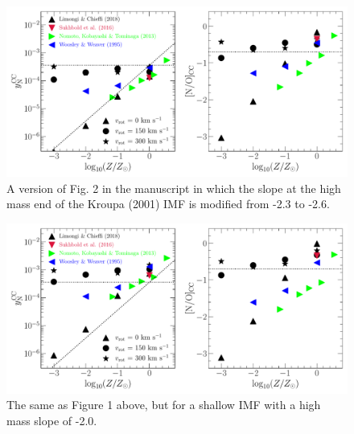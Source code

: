 \documentclass[12pt]{article}
\begin{document}
\newpage
\begin{figure}[!h]
\centering
\includegraphics[scale = 0.6]{n_cc_yields_steep.pdf}
\caption{
A version of Fig. 2 in the manuscript in which the slope at the high mass end
of the Kroupa (2001) IMF is modified from -2.3 to -2.6.
}
\end{figure}
\begin{figure}[!h]
\centering
\includegraphics[scale = 0.6]{n_cc_yields_shallow.pdf}
\caption{
The same as Figure 1 above, but for a shallow IMF with a high mass slope of
-2.0.
}
\end{figure}
\end{document}
